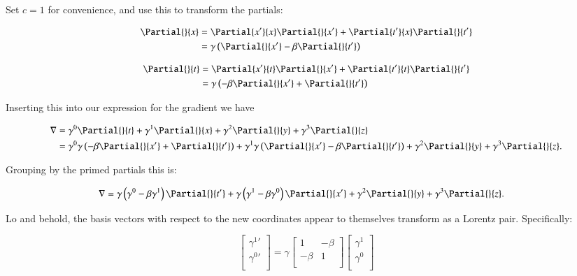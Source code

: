 Set $c=1$ for convenience, and use this to transform the partials:

\begin{align*}
\Partial{}{x} 
&= \Partial{x'}{x} \Partial{}{x'} + \Partial{t'}{x} \Partial{}{t'} \\
&= \gamma \left( \Partial{}{x'} -\beta \Partial{}{t'} \right) \\
\end{align*}

\begin{align*}
\Partial{}{t} 
&= \Partial{x'}{t} \Partial{}{x'} + \Partial{t'}{t} \Partial{}{t'} \\
&= \gamma \left( -\beta \Partial{}{x'} + \Partial{}{t'} \right) \\
\end{align*}

Inserting this into our expression for the gradient we have

\begin{align*}
\grad 
&= \gamma^0 \Partial{}{t}
 + \gamma^1 \Partial{}{x} 
 + \gamma^2 \Partial{}{y}
 + \gamma^3 \Partial{}{z} \\
&= \gamma^0 \gamma \left( -\beta \Partial{}{x'} + \Partial{}{t'} \right) 
 + \gamma^1 \gamma \left( \Partial{}{x'} -\beta \Partial{}{t'} \right)
 + \gamma^2 \Partial{}{y}
 + \gamma^3 \Partial{}{z}.
\end{align*}

Grouping by the primed partials this is:

\begin{align*}
\grad 
&= \gamma \left(\gamma^0 - \beta\gamma^1\right) \Partial{}{t'}
 + \gamma \left(\gamma^1 - \beta\gamma^0\right) \Partial{}{x'}
 + \gamma^2 \Partial{}{y}
 + \gamma^3 \Partial{}{z}.
\end{align*}

Lo and behold, the basis vectors with respect to the new coordinates appear to themselves transform as a Lorentz pair.  Specifically:

\begin{equation*}
\begin{bmatrix}
{\gamma^1}' \\
{\gamma^0}' \\
\end{bmatrix}
=
\gamma
\begin{bmatrix}
1 & -\beta \\
-\beta & 1 \\
\end{bmatrix}
\begin{bmatrix}
{\gamma^1} \\
{\gamma^0} \\
\end{bmatrix}
\end{equation*}

